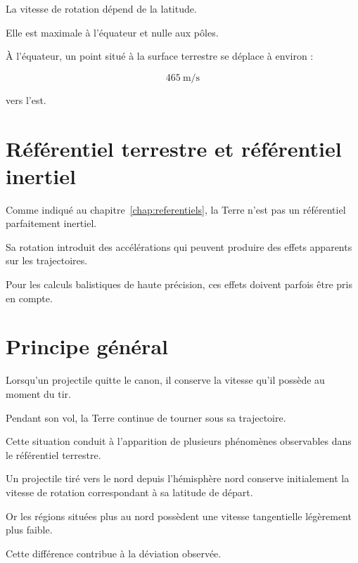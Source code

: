 La vitesse de rotation dépend de la latitude.

Elle est maximale à l'équateur et nulle aux pôles.

\begin{exemple}

À l'équateur, un point situé à la surface terrestre se déplace à environ :

\begin{equation}
465~\mathrm{m/s}
\end{equation}

vers l'est.

\end{exemple}

\section{Référentiel terrestre et référentiel inertiel}

Comme indiqué au chapitre~\ref{chap:referentiels}, la Terre n'est pas un
référentiel parfaitement inertiel.

Sa rotation introduit des accélérations qui peuvent produire des effets
apparents sur les trajectoires.

Pour les calculs balistiques de haute précision, ces effets doivent parfois
être pris en compte.

\section{Principe général}

Lorsqu'un projectile quitte le canon, il conserve la vitesse qu'il possède au
moment du tir.

Pendant son vol, la Terre continue de tourner sous sa trajectoire.

Cette situation conduit à l'apparition de plusieurs phénomènes observables
dans le référentiel terrestre.

\begin{exemple}

Un projectile tiré vers le nord depuis l'hémisphère nord conserve initialement
la vitesse de rotation correspondant à sa latitude de départ.

Or les régions situées plus au nord possèdent une vitesse tangentielle
légèrement plus faible.

Cette différence contribue à la déviation observée.

\end{exemple}

